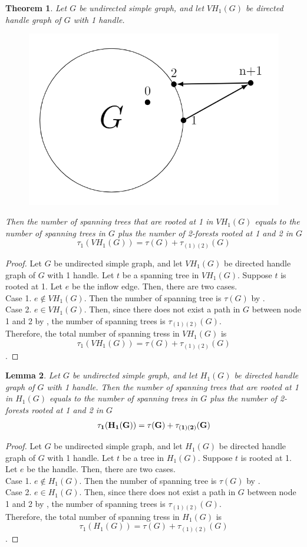 \documentclass[twoside,11pt]{article}
\newtheorem{theorem}{Theorem}[section]
\newtheorem{lemma}[theorem]{Lemma}
\numberwithin{equation}{section} \DeclareMathOperator{\Var}{Var}
\newcommand{\bpf}{\begin{proof}}
\newcommand{\epf}{\end{proof}}
\newcommand{\blm}{\begin{lemma}}
\newcommand{\elm}{\end{lemma}}
\newcommand{\bthm}{\begin{theorem}}
\newcommand{\ethm}{\end{theorem}}
\begin{document}
\bthm
Let $G$ be undirected simple graph, and let $VH_1(G)$ be directed handle graph of $G$ with 1 handle. 
\begin{figure}[H]
    \centering
    \includegraphics[scale=0.3]{tik_1handle.PNG}
\end{figure}
Then the number of spanning trees that are rooted at 1 in $VH_1(G)$ equals to the number of spanning trees in $G$ plus the number of 2-forests rooted at 1 and 2 in $G$ \[
 \tau_1(VH_1(G)) = \tau(G)+\tau_{(1)(2)}(G)
\]
\ethm

\bpf
Let $G$ be undirected simple graph, and
let $VH_1(G)$ be directed handle graph of $G$ with 1 handle. Let $t$ be a spanning tree in $VH_1(G)$. Suppose $t$ is rooted at 1. Let $e$ be the inflow edge. Then, there are two cases.\\
Case 1. $e\notin VH_1(G)$. Then the number of spanning tree is $\tau(G)$ by .\\
Case 2. $e \in VH_1(G)$. Then, since there does not exist a path in $G$ between node 1 and 2 by , the number of spanning trees is $\tau_{(1)(2)}(G)$.\\
Therefore, the total number of spanning tress in $VH_1(G)$ is  $$ \tau_1(VH_1(G)) = \tau(G)+\tau_{(1)(2)}(G)$$ .
\epf


\blm\label{DH Rooted at 1}
Let $G$ be undirected simple graph, and let $H_1(G)$ be directed handle graph of $G$ with 1 handle. Then the number of spanning trees that are rooted at 1 in $H_1(G)$ equals to the number of spanning trees in $G$ plus the number of 2-forests rooted at 1 and 2 in $G$ \[
 \bf{\tau_1(H_1(G)) = \tau(G)+\tau_{(1)(2)}(G)} 
\]
\elm

\bpf
Let $G$ be undirected simple graph, and
let $H_1(G)$ be directed handle graph of $G$ with 1 handle. Let $t$ be a tree in $H_1(G)$. Suppose $t$ is rooted at 1. Let $e$ be the handle. Then, there are two cases.\\
Case 1. $e\notin H_1(G)$. Then the number of spanning tree is $\tau(G)$ by .\\
Case 2. $e \in H_1(G)$. Then, since there does not exist a path in $G$ between node 1 and 2 by , the number of spanning trees is $\tau_{(1)(2)}(G)$.\\
Therefore, the total number of spanning tress in $H_1(G)$ is  $$ \tau_1(H_1(G)) = \tau(G)+\tau_{(1)(2)}(G)$$ .
\epf
\end{document}
